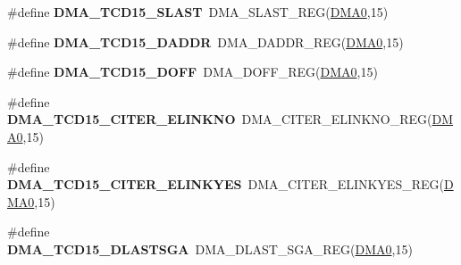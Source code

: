 \begin{DoxyCompactItemize}
\item 
\#define {\bfseries D\+M\+A\+\_\+\+T\+C\+D15\+\_\+\+S\+L\+A\+ST}~D\+M\+A\+\_\+\+S\+L\+A\+S\+T\+\_\+\+R\+EG(\hyperlink{group__DMA__Peripheral__Access__Layer_ga4103044f9ca209772f513dc694513ffb}{D\+M\+A0},15)\hypertarget{group__DMA__Register__Accessor__Macros_gab67f5b3eb4380c25b5017ac231f273b8}{}\label{group__DMA__Register__Accessor__Macros_gab67f5b3eb4380c25b5017ac231f273b8}

\item 
\#define {\bfseries D\+M\+A\+\_\+\+T\+C\+D15\+\_\+\+D\+A\+D\+DR}~D\+M\+A\+\_\+\+D\+A\+D\+D\+R\+\_\+\+R\+EG(\hyperlink{group__DMA__Peripheral__Access__Layer_ga4103044f9ca209772f513dc694513ffb}{D\+M\+A0},15)\hypertarget{group__DMA__Register__Accessor__Macros_ga96883b08084e57c2324a7a945fcc7107}{}\label{group__DMA__Register__Accessor__Macros_ga96883b08084e57c2324a7a945fcc7107}

\item 
\#define {\bfseries D\+M\+A\+\_\+\+T\+C\+D15\+\_\+\+D\+O\+FF}~D\+M\+A\+\_\+\+D\+O\+F\+F\+\_\+\+R\+EG(\hyperlink{group__DMA__Peripheral__Access__Layer_ga4103044f9ca209772f513dc694513ffb}{D\+M\+A0},15)\hypertarget{group__DMA__Register__Accessor__Macros_gab3f5f71e56f4d63ef32d03ec031b3b45}{}\label{group__DMA__Register__Accessor__Macros_gab3f5f71e56f4d63ef32d03ec031b3b45}

\item 
\#define {\bfseries D\+M\+A\+\_\+\+T\+C\+D15\+\_\+\+C\+I\+T\+E\+R\+\_\+\+E\+L\+I\+N\+K\+NO}~D\+M\+A\+\_\+\+C\+I\+T\+E\+R\+\_\+\+E\+L\+I\+N\+K\+N\+O\+\_\+\+R\+EG(\hyperlink{group__DMA__Peripheral__Access__Layer_ga4103044f9ca209772f513dc694513ffb}{D\+M\+A0},15)\hypertarget{group__DMA__Register__Accessor__Macros_gaa8ed6e0682627b986b2ed3b7a7ccd157}{}\label{group__DMA__Register__Accessor__Macros_gaa8ed6e0682627b986b2ed3b7a7ccd157}

\item 
\#define {\bfseries D\+M\+A\+\_\+\+T\+C\+D15\+\_\+\+C\+I\+T\+E\+R\+\_\+\+E\+L\+I\+N\+K\+Y\+ES}~D\+M\+A\+\_\+\+C\+I\+T\+E\+R\+\_\+\+E\+L\+I\+N\+K\+Y\+E\+S\+\_\+\+R\+EG(\hyperlink{group__DMA__Peripheral__Access__Layer_ga4103044f9ca209772f513dc694513ffb}{D\+M\+A0},15)\hypertarget{group__DMA__Register__Accessor__Macros_ga9b6c6be7d544c5d50b83c331307017f4}{}\label{group__DMA__Register__Accessor__Macros_ga9b6c6be7d544c5d50b83c331307017f4}

\item 
\#define {\bfseries D\+M\+A\+\_\+\+T\+C\+D15\+\_\+\+D\+L\+A\+S\+T\+S\+GA}~D\+M\+A\+\_\+\+D\+L\+A\+S\+T\+\_\+\+S\+G\+A\+\_\+\+R\+EG(\hyperlink{group__DMA__Peripheral__Access__Layer_ga4103044f9ca209772f513dc694513ffb}{D\+M\+A0},15)\hypertarget{group__DMA__Register__Accessor__Macros_ga490c3331e921f78f70ba0faba15987f1}{}\label{group__DMA__Register__Accessor__Macros_ga490c3331e921f78f70ba0faba15987f1}


\end{DoxyCompactItemize}
